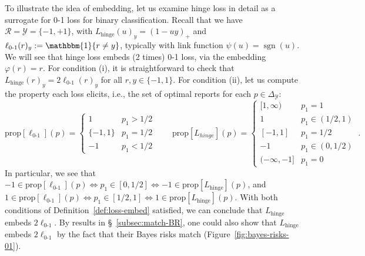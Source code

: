 \documentclass[11pt]{article}
\newcommand{\prop}[1]{\mathrm{prop}[#1]}
\newcommand{\simplex}{\Delta_\Y}
\newcommand{\R}{\mathcal{R}}
\newcommand{\Y}{\mathcal{Y}}
\newcommand{\ones}{\mathbbm{1}}
\newcommand{\Ind}[1]{\ones\{#1\}}
\newcommand{\hinge}{L_{\mathrm{hinge}}}
\newcommand{\ellzo}{\ell_{\text{0-1}}}
\DeclareMathOperator*{\sgn}{sgn}
\begin{document}
To illustrate the idea of embedding, let us examine hinge loss in detail as a surrogate for 0-1 loss for binary classification.
Recall that we have $\R = \Y = \{-1, +1\}$, with $\hinge(u)_y = (1 - uy)_+$ and $\ellzo(r)_y := \Ind{r\neq y}$, typically with link function $\psi(u) = \sgn(u)$.
We will see that hinge loss embeds (2 times) 0-1 loss, via the embedding $\varphi(r) = r$.
For condition (i), it is straightforward to check that $\hinge(r)_y = 2\ellzo(r)_y$ for all $r,y\in\{-1,1\}$.
For condition (ii), let us compute the property each loss elicits, i.e., the set of optimal reports for each $p\in\simplex$:
\[
\prop{\ellzo}(p) = \begin{cases}
1 & p_1 > 1/2 \\
\{-1,1\} & p_1 = 1/2\\
-1 & p_1 < 1/2
\end{cases}
\qquad
\prop{L_{hinge}}(p) = \begin{cases}
[1,\infty) & p_1 = 1\\
1 & p_1 \in (1/2,1) \\
[-1,1] & p_1 = 1/2\\
-1& p_1 \in (0, 1/2)\\
(-\infty, -1]& p_1 = 0
\end{cases}~.
\]
In particular, we see that $-1 \in \prop{\ellzo}(p) \iff p_1 \in [0, 1/2] \iff -1 \in \prop{\hinge}(p)$, and $1 \in \prop{\ellzo}(p) \iff p_1 \in [1/2,1] \iff 1 \in \prop{\hinge}(p)$.
With both conditions of Definition~\ref{def:loss-embed} satisfied, we can conclude that $\hinge$ embeds $2\ellzo$.
By results in \S~\ref{subsec:match-BR}, one could also show that $\hinge$ embeds $2\ellzo$ by the fact that their Bayes risks match (Figure~\ref{fig:bayes-risks-01}).
\end{document}
